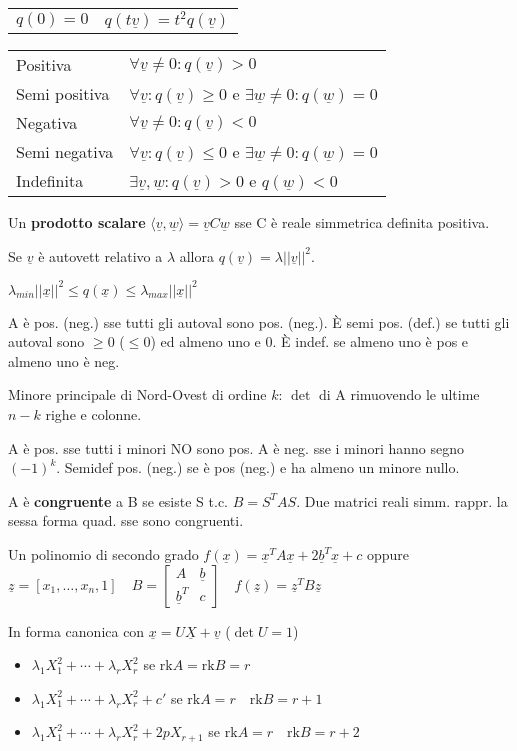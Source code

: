 \documentclass[10pt,landscape]{article}
\renewcommand{\vec}[1]{\underline{#1}}
\newcommand{\rk}{\mathrm{rk}}
\begin{document}
\begin{multicols}{3}
\begin{tabular}{ll}
	$q(0)=0$ & $q(t\vec{v}) = t^2q(\vec{v})$
\end{tabular}

\begin{tabular}{ll}
	Positiva & $\forall \vec{v} \ne 0: q(\vec{v}) > 0$ \\
	Semi positiva & $\forall \vec{v}: q(\vec{v}) \ge 0$ e $\exists \vec{w} \ne 0 : q(\vec{w}) = 0$ \\
	Negativa & $\forall \vec{v} \ne 0: q(\vec{v}) < 0$ \\
	Semi negativa & $\forall \vec{v}: q(\vec{v}) \le 0$ e $\exists \vec{w} \ne 0 : q(\vec{w}) = 0$ \\
	Indefinita & $\exists \vec{v}, \vec{w}: q(\vec{v}) > 0$ e $q(\vec{w}) < 0$
\end{tabular}

Un \textbf{prodotto scalare} $\langle\vec{v}, \vec{w}\rangle = \vec{v}C\vec{w}$ sse C è reale simmetrica definita positiva.

Se $\vec{v}$ è autovett relativo a $\lambda$ allora $q(\vec{v}) = \lambda||\vec{v}||^2$. 

$\lambda_{min}||\vec{x}||^2 \le q(\vec{x}) \le \lambda_{max}||\vec{x}||^2$

A è pos. (neg.) sse tutti gli autoval sono pos. (neg.). È semi pos. (def.) se tutti gli autoval sono $\ge 0$ ($\le 0$) ed almeno uno e 0. È indef. se almeno uno è pos e almeno uno è neg.

Minore principale di Nord-Ovest di ordine $k$: $\det$ di A rimuovendo le ultime $n-k$ righe e colonne.

A è pos. sse tutti i minori NO sono pos. A è neg. sse i minori hanno segno $(-1)^k$. Semidef pos. (neg.) se è pos (neg.) e ha almeno un minore nullo.

A è \textbf{congruente} a B se esiste S t.c. $B=S^TAS$. Due matrici reali simm. rappr. la sessa forma quad. sse sono congruenti.

Un polinomio di secondo grado 
$f(\vec{x}) = \vec{x}^TA\vec{x}+2\vec{b}^T\vec{x}+c$
	oppure $\vec{z}=[x_1, \dots, x_n, 1] \quad
	B = \begin{bmatrix}A & \vec{b}\\\vec{b}^T & c\end{bmatrix} \quad
	f(\vec{z}) = \vec{z}^TB\vec{z}$

In forma canonica con $\vec{x} = U\vec{X}+\vec{v}$ ($\det U = 1$)

\begin{itemize}
	\item $\lambda_1X_1^2 + \cdots + \lambda_rX_r^2$ se $\rk A = \rk B = r$
	\item $\lambda_1X_1^2 + \cdots + \lambda_rX_r^2 + c'$ se $\rk A = r \quad \rk B = r+1$
	\item $\lambda_1X_1^2 + \cdots + \lambda_rX_r^2 + 2pX_{r+1}$ se $\rk A = r \quad \rk B = r+2$
\end{itemize}


\end{multicols}
\end{document}
